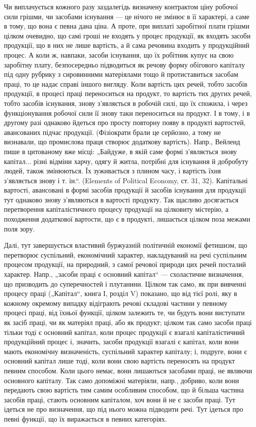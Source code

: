 Чи виплачується кожного разу заздалегідь визначену контрактом ціну
робочої сили грішми, чи засобами існування — це нічого не змінює в її
характері, а саме в тому, що вона є певна дана ціна. А проте, при виплаті
заробітної плати грішми цілком очевидно, що самі гроші не входять
у процес продукції, як входять засоби продукції, що в них не лише
вартість, а й сама речовина входить у продукційний процес. А коли ж,
навпаки, засоби існування, що їх робітник купує на свою заробітну плату,
безпосередньо підводиться як речову форму обігового капіталу під
одну рубрику з сировинними матеріялами тощо й протиставиться засобам
праці, то це надає справі іншого вигляду. Коли вартість цих речей,
тобто засобів продукції, в процесі праці переноситься на продукт, то
вартість тих других речей, тобто засобів існування, знову з’являється в
робочій силі, що їх спожила, і через функціонування робочої сили її знову
таки переноситься на продукт. І в тому, і в другому разі однаково
йдеться про просту повторну появу в продукті вартостей, авансованих
підчас продукції. (Фізіократи брали це серйозно, а тому не визнавали,
що промислова праця створює додаткову вартість). Напр., Вейленд
пише в цитованому вже місці: „Байдуже, в якій саме формі з’являється
знову капітал... різні відміни харчу, одягу й житла, потрібні для існування
й добробуту людей, також змінюються. Їх зуживається з плином
часу, і вартість їхня з’являється знову і т. ін.“. (Elements of Political
Economy, ст. 31, 32). Капітальні вартості, авансовані в формі
засобів продукції й засобів існування для продукції тут однаково знову
з’являються в вартості продукту. Так щасливо досягається перетворення
капіталістичного процесу продукції на цілковиту містерію, а походження
додаткової вартости, що є в продукті, лишається цілком поза
межами поля зору.

Далі, тут завершується властивий буржуазній політичній економії фетишизм,
що перетворює суспільний, економічний характер, накладуваний
на речі суспільним процесом продукції, на природний, з самої речової
природи цих речей посталий характер. Напр., „засоби праці є основний
капітал“ — схоластичне визначення, що призводить до суперечностей і плутанини.
Цілком так само, як при вивченні процесу праці („Капітал“, книга
І, розділ V) показано, що від тієї ролі, яку в кожному окремому
випадку відіграють речові складові частини у певному процесі праці,
від їхньої функції, цілком залежить те, чи будуть вони виступати як
засіб праці, чи як матеріял праці, або як продукт; цілком так само засоби
праці тільки тоді є основний капітал, коли процес продукції є взагалі
капіталістичний продукційний процес і, значить, засоби продукції
взагалі є капітал, коли вони мають економічну визначеність, суспільний
характер капіталу; і, подруге, вони є основний капітал лише тоді, коли
вони свою вартість переносять на продукт певним способом. Коли цього
немає, вони лишаються засобами праці, не являючи основного капіталу.
Так само допоміжні матеріяли, напр., добриво, коли вони передають
свою вартість тим самим особливим способом, що й більша частина засобів
праці, стають основним капіталом, хоч вони й не є засоби праці.
Тут ідеться не про визначення, що під нього можна підводити речі. Тут
ідеться про певні функції, що їх виражається в певних категоріях.

